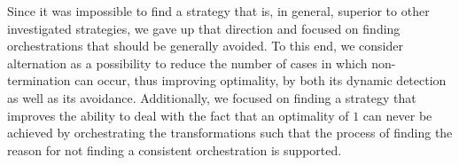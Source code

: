 Since it was impossible to find a strategy that is, in general, superior to other investigated strategies, we gave up that direction and focused on finding orchestrations that should be generally avoided.
To this end, we consider alternation as a possibility to reduce the number of cases in which non-termination can occur, thus improving optimality, by both its dynamic detection as well as its avoidance.
Additionally, we focused on finding a strategy that improves the ability to deal with the fact that an optimality of $1$ can never be achieved by orchestrating the transformations such that the process of finding the reason for not finding a consistent orchestration is supported.







